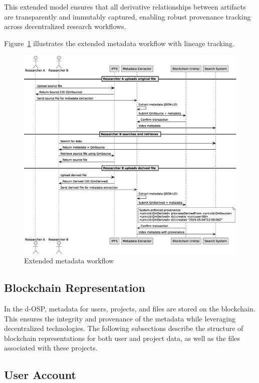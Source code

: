 \documentclass[final]{rc-book-2.14}
\begin{document}
This extended model ensures that all derivative relationships between artifacts are transparently and immutably captured, enabling robust provenance tracking across decentralized research workflows.

Figure~\ref{fig:provenance_lineage} illustrates the extended metadata workflow with lineage tracking.

\begin{figure}[htbp]
    \centering
    \includegraphics[scale=0.4]{fig/provenance_lineage_2.eps}
    \caption{Extended metadata workflow}
    \label{fig:provenance_lineage}
\end{figure}


\subsection{Blockchain Representation}

In the d-OSP, metadata for users, projects, and files are stored on the blockchain. This ensures the integrity and provenance of the metadata while leveraging decentralized technologies. The following subsections describe the structure of blockchain representations for both user and project data, as well as the files associated with these projects.

\subsection{User Account}
\end{document}
